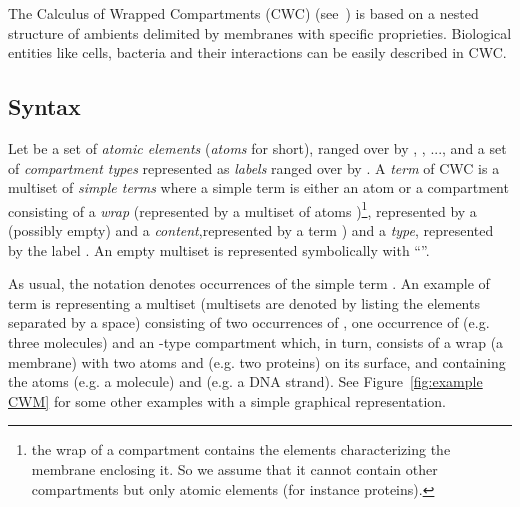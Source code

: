 \newcommand{\ov}[1]{\overline{#1}}
\newcommand{\srewRule}[3]{#1\srew{#3}#2}
\newcommand{\srew}[1]{\stackrel{#1}{\longmapsto}}
\newcommand{\csrew}[1]{\stackrel{#1}{\longmapsto}_{\sf c}}
\renewcommand{\wr}[3]{( #1 \into #2)^{#3}}


The Calculus of Wrapped Compartments (CWC)
(see~\cite{preQAPL2010,CDDGGT_TCSB11}) is based on a nested structure of ambients delimited by membranes with specific proprieties. Biological entities
like cells, bacteria and their interactions can be easily described in CWC.

\subsection{Syntax}
\label{CWC_formalism - syntax}

Let  be a set of  \emph{atomic elements} (\emph{atoms} for
short), ranged over by , , ..., and   a set of \emph{compartment types} represented as \emph{labels} ranged over by .
A \emph{term} of CWC is a multiset  of  \emph{simple terms} where a simple term  is either an atom  or a compartment  consisting of a \emph{wrap}
 (represented by a multiset of atoms )\footnote{the wrap of a compartment contains the elements characterizing the membrane enclosing it. So we assume that it cannot contain other compartments but only atomic elements (for instance proteins).}, represented by a (possibly empty) and a \emph{content},represented by a term
) and a \emph{type}, represented by the label . An empty multiset is represented symbolically with ``''.

\begin{figure*}\centering
{}
\centering
{}

\caption{\textbf{(a)} represents ; \textbf{(b)} represents ; \textbf{(c)} represents }
\label{fig:example CWM}
\end{figure*}
As usual, the notation  denotes  occurrences of the simple term . An example of term is  representing a multiset (multisets are denoted by listing the elements separated by a space) consisting of two occurrences of , one occurrence
of  (e.g. three molecules) and an -type compartment  which, in turn, consists of a wrap (a membrane) with two
atoms  and  (e.g. two proteins) on its surface, and containing the atoms  (e.g. a molecule) and  (e.g. a DNA strand). See
Figure~\ref{fig:example CWM} for some other examples with a simple graphical representation.




